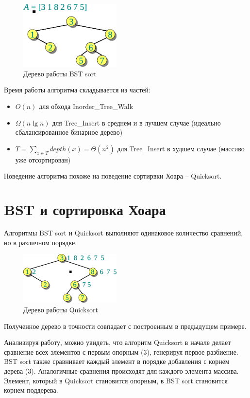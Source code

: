 \begin{figure}[ht]
  \centering
  \includegraphics[width=2in]{lecture9/bs_tree.eps}
  \caption{Дерево работы BST sort}
  \label{fig:bs_tree}
\end{figure}

Время работы алгоритма складывается из частей:
\begin{itemize}
\item $O(n)$ для обхода Inorder\_Tree\_Walk
\item $\Omega(n \lg n)$ для Tree\_Insert в среднем и в лучшем случае (идеально сбалансированное бинарное дерево)
\item $T = \sum_{x \in T} depth(x) = \Theta(n^2)$ для Tree\_Insert в худшем случае (массиво уже отсортирован)
\end{itemize}

Поведение алгоритма похоже на поведение сортирвки Хоара -- Quicksort.

\section{BST и сортировка Хоара}
Алгоритмы BST sort и Quicksort выполняют одинаковое количество сравнений, но в различном порядке.
\begin{figure}[ht]
  \centering
  \includegraphics[width=2in]{lecture9/qs_tree.eps}
  \caption{Дерево работы Quicksort}
  \label{fig:qs_tree}
\end{figure}

Полученное дерево в точности совпадает с построенным в предыдущем примере.

Анализируя работу, можно увидеть, что алгоритм Quicksort в начале делает сравнение всех элементов с первым опорным (3), генерируя первое разбиение. BST sort также сравнивает каждый элемент в порядке добавления с корнем дерева (3). Аналогичные сравнения происходят для каждого элемента массива. Элемент, который в Quicksort становится опорным, в BST sort становится корнем поддерева.

